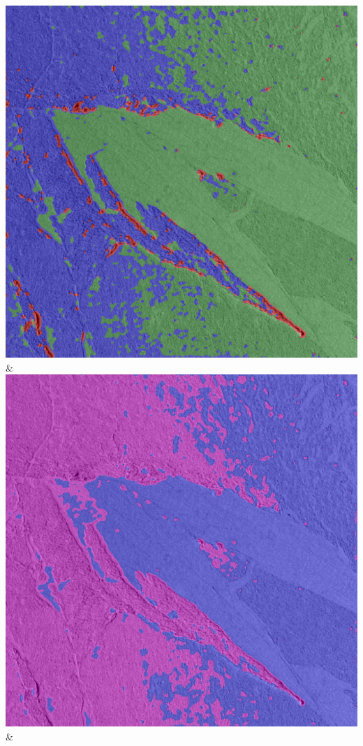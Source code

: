\begin{table}[h!]
\begin{tabularx}{\textwidth}
		\includegraphics[width=0.9\linewidth]{images/gen/activation_functions/p03_03.png_relu.png} &
		\includegraphics[width=0.9\linewidth]{images/gen/activation_functions/p03_03.png_sigmoid.png} &

\end{tabularx}
\end{table}
